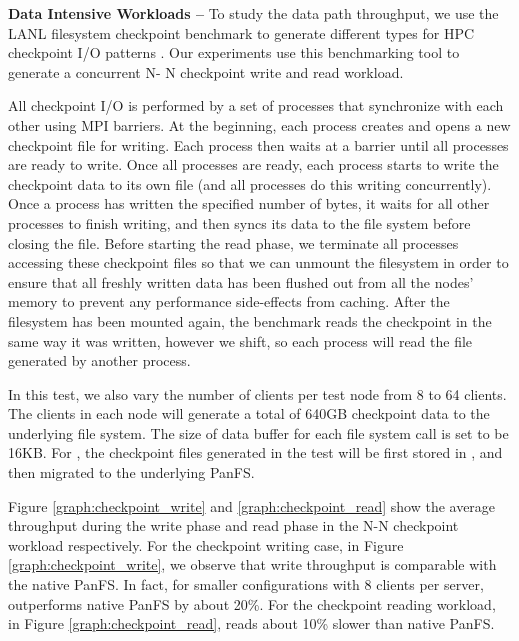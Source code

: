 
\textbf{Data Intensive Workloads -- }
To study the data path throughput, we use the LANL filesystem checkpoint 
benchmark to generate different types for HPC checkpoint I/O patterns
\cite{mpiio}.
Our experiments use this benchmarking tool to generate a concurrent N-
N checkpoint write and read workload.

All checkpoint I/O is performed by a set of processes
that synchronize with each other using MPI barriers.
At the beginning, each process creates and opens a new checkpoint file
for writing. 
Each process then waits at a barrier until all processes are ready to write.
Once all processes are ready, each process starts to write the checkpoint data 
to its own file (and all processes do this writing concurrently).
Once a process has written the specified number of bytes, it waits for all
other processes to finish writing, and then syncs its data to the file system
before closing the file.
Before starting the read phase, we terminate all processes
accessing these checkpoint files so that
we can unmount the filesystem in order to ensure that
all freshly written data has been flushed out from all the nodes' memory
to prevent any performance side-effects from caching.
After the filesystem has been mounted again,
the benchmark reads the checkpoint in the same way it was written,
however we shift, so each process will read
the file generated by another process.

In this test, we also vary the number of clients per test node
from 8 to 64 clients. The clients in each node will generate a total of
640GB checkpoint data to the underlying file system.
The size of data buffer for each file system call is set to be 16KB.
For \psys, the checkpoint files generated in the test will be
first stored in \tfs, and then migrated to the underlying PanFS.

Figure \ref{graph:checkpoint_write} and \ref{graph:checkpoint_read}
show the average throughput during the write phase and read phase
in the N-N checkpoint workload respectively. 
For the checkpoint writing case, in Figure \ref{graph:checkpoint_write}, we 
observe that \psys write throughput is comparable with the native PanFS. In
fact, for smaller configurations with 8 clients per server, \psys outperforms
native PanFS by about 20\%.
For the checkpoint reading workload, in Figure \ref{graph:checkpoint_read}, 
\psys reads about 10\% slower than native PanFS.

